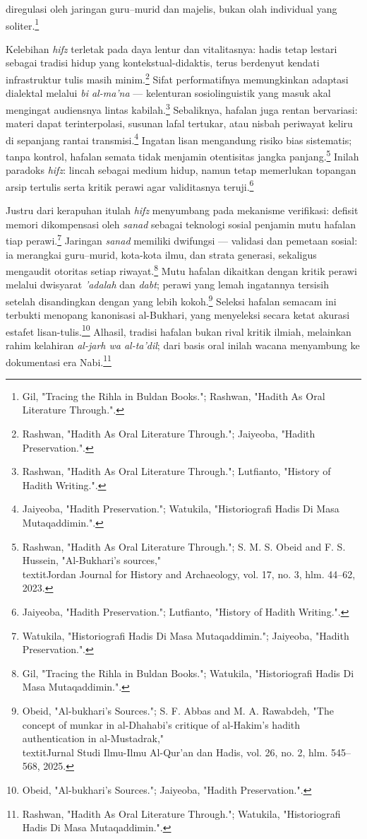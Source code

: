 diregulasi oleh jaringan guru--murid dan majelis, bukan olah individual yang soliter.\footnote{Gil, "Tracing the Rihla in Buldan Books."; Rashwan, "Hadith As Oral Literature Through.".}

Kelebihan \textit{hifz} terletak pada daya lentur dan vitalitasnya: hadis tetap lestari sebagai tradisi hidup yang kontekstual-didaktis, terus berdenyut kendati infrastruktur tulis masih minim.\footnote{Rashwan, "Hadith As Oral Literature Through."; Jaiyeoba, "Hadith Preservation.".} Sifat performatifnya memungkinkan adaptasi dialektal melalui \textit{bi al-ma'na} --- kelenturan sosiolinguistik yang masuk akal mengingat audiensnya lintas kabilah.\footnote{Rashwan, "Hadith As Oral Literature Through."; Lutfianto, "History of Hadith Writing.".} Sebaliknya, hafalan juga rentan bervariasi: materi dapat terinterpolasi, susunan lafal tertukar, atau nisbah periwayat keliru di sepanjang rantai transmisi.\footnote{Jaiyeoba, "Hadith Preservation."; Watukila, "Historiografi Hadis Di Masa Mutaqaddimin.".} Ingatan lisan mengandung risiko bias sistematis; tanpa kontrol, hafalan semata tidak menjamin otentisitas jangka panjang.\footnote{Rashwan, "Hadith As Oral Literature Through."; S. M. S. Obeid and F. S. Hussein, "Al-Bukhari's sources," \\textit{Jordan Journal for History and Archaeology}, vol. 17, no. 3, hlm. 44--62, 2023.} Inilah paradoks \textit{hifz}: lincah sebagai medium hidup, namun tetap memerlukan topangan arsip tertulis serta kritik perawi agar validitasnya teruji.\footnote{Jaiyeoba, "Hadith Preservation."; Lutfianto, "History of Hadith Writing.".}

Justru dari kerapuhan itulah \textit{hifz} menyumbang pada mekanisme verifikasi: defisit memori dikompensasi oleh \textit{sanad} sebagai teknologi sosial penjamin mutu hafalan tiap perawi.\footnote{Watukila, "Historiografi Hadis Di Masa Mutaqaddimin."; Jaiyeoba, "Hadith Preservation.".} Jaringan \textit{sanad} memiliki dwifungsi --- validasi dan pemetaan sosial: ia merangkai guru--murid, kota-kota ilmu, dan strata generasi, sekaligus mengaudit otoritas setiap riwayat.\footnote{Gil, "Tracing the Rihla in Buldan Books."; Watukila, "Historiografi Hadis Di Masa Mutaqaddimin.".} Mutu hafalan dikaitkan dengan kritik perawi melalui dwisyarat \textit{'adalah} dan \textit{dabt}; perawi yang lemah ingatannya tersisih setelah disandingkan dengan yang lebih kokoh.\footnote{Obeid, "Al-bukhari's Sources."; S. F. Abbas and M. A. Rawabdeh, "The concept of munkar in al-Dhahabi's critique of al-Hakim's hadith authentication in al-Mustadrak," \\textit{Jurnal Studi Ilmu-Ilmu Al-Qur'an dan Hadis}, vol. 26, no. 2, hlm. 545--568, 2025.} Seleksi hafalan semacam ini terbukti menopang kanonisasi al-Bukhari, yang menyeleksi secara ketat akurasi estafet lisan-tulis.\footnote{Obeid, "Al-bukhari's Sources."; Jaiyeoba, "Hadith Preservation.".} Alhasil, tradisi hafalan bukan rival kritik ilmiah, melainkan rahim kelahiran \textit{al-jarh wa al-ta'dil}; dari basis oral inilah wacana menyambung ke dokumentasi era Nabi.\footnote{Rashwan, "Hadith As Oral Literature Through."; Watukila, "Historiografi Hadis Di Masa Mutaqaddimin.".}

